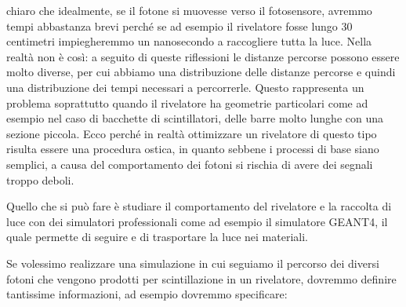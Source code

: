\begin{figure}[H]
   \centering
\end{figure}

\E chiaro che idealmente, se il fotone si muovesse verso il fotosensore, avremmo tempi abbastanza brevi perché se ad esempio il rivelatore fosse lungo 30 centimetri impiegheremmo un nanosecondo a raccogliere tutta la luce. Nella realtà non è così: a seguito di queste riflessioni le distanze percorse possono essere molto diverse, per cui abbiamo una distribuzione delle distanze percorse e quindi una distribuzione dei tempi necessari a percorrerle. Questo rappresenta un problema soprattutto quando il rivelatore ha geometrie particolari come ad esempio nel caso di bacchette di scintillatori, delle barre molto lunghe con una sezione piccola. Ecco perché in realtà ottimizzare un rivelatore di questo tipo risulta essere una procedura ostica, in quanto sebbene i processi di base siano semplici, a causa del comportamento dei fotoni si rischia di avere dei segnali troppo deboli.


Quello che si può fare è studiare il comportamento del rivelatore e la raccolta di luce con dei simulatori professionali come ad esempio il simulatore GEANT4, il quale permette di seguire e di trasportare la luce nei materiali. 

Se volessimo realizzare una simulazione in cui seguiamo il percorso dei diversi fotoni che vengono prodotti per scintillazione in un rivelatore, dovremmo definire tantissime informazioni, ad esempio dovremmo specificare:

